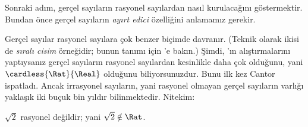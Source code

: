 \documentclass[../../../include/open-logic-section]{subfiles}
\begin{document}

Sonraki adım, gerçel sayıların rasyonel sayılardan nasıl kurulacağını göstermektir.
Bundan önce gerçel sayıların \emph{ayırt edici} özelliğini anlamamız gerekir.

Gerçel sayılar rasyonel sayılara çok benzer biçimde davranır. (Teknik olarak
ikisi de \emph{sıralı cisim} örneğidir; bunun tanımı için
'e bakın.) Şimdi, 'ın
alıştırmalarını yaptıysanız gerçel sayıların rasyonel sayılardan kesinlikle daha
çok olduğunu, yani $\cardless{\Rat}{\Real}$ olduğunu biliyorsunuzdur. Bunu ilk
kez Cantor ispatladı. Ancak irrasyonel sayıların, yani rasyonel olmayan gerçel
sayıların varlığı yaklaşık iki buçuk bin yıldır bilinmektedir. Nitekim:
\begin{thm}
$\sqrt{2}$ rasyonel değildir; yani $\sqrt{2} \notin \Rat$.
\end{thm}
\end{document}
